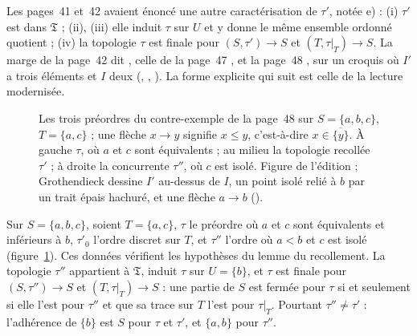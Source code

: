 Les pages~41 et~42 avaient énoncé une autre caractérisation de $\tau'$, notée e) : (i) $\tau'$ est dans $\mathfrak T$ ; (ii), (iii) elle induit $\tau$ sur $U$ et y donne le même ensemble ordonné quotient ; (iv) la topologie $\tau$ est finale pour $(S, \tau') \to S$ et $(T, \tau|_T) \to S$. La marge de la page~42 dit , celle de la page~47 , et la page~48 , sur un croquis où $I'$ a trois éléments et $I$ deux (, , ). La forme explicite qui suit est celle de la lecture modernisée.

\begin{figure}[htbp]
\centering
{}
\caption{Les trois préordres du contre-exemple de la page~48 sur $S = \{a, b, c\}$, $T = \{a, c\}$ ; une flèche $x \to y$ signifie $x \leq y$, c'est-à-dire $x \in \overline{\{y\}}$. À gauche $\tau$, où $a$ et $c$ sont équivalents ; au milieu la topologie recollée $\tau'$ ; à droite la concurrente $\tau''$, où $c$ est isolé. Figure de l'édition ; Grothendieck dessine $I'$ au-dessus de $I$, un point isolé relié à $b$ par un trait épais hachuré, et une flèche $a \to b$ ().}
\label{fig:156-5-ultrafaux}
\end{figure}

\begin{encadre}
\begin{contrexemple}
Sur $S = \{a, b, c\}$, soient $T = \{a, c\}$, $\tau$ le préordre où $a$ et $c$ sont équivalents et inférieurs à $b$, $\tau'_0$ l'ordre discret sur $T$, et $\tau''$ l'ordre où $a < b$ et $c$ est isolé (figure~\ref{fig:156-5-ultrafaux}). Ces données vérifient les hypothèses du lemme du recollement. La topologie $\tau''$ appartient à $\mathfrak T$, induit $\tau$ sur $U = \{b\}$, et $\tau$ est finale pour $(S, \tau'') \to S$ et $(T, \tau|_T) \to S$ : une partie de $S$ est fermée pour $\tau$ si et seulement si elle l'est pour $\tau''$ et que sa trace sur $T$ l'est pour $\tau|_T$. Pourtant $\tau'' \neq \tau'$ : l'adhérence de $\{b\}$ est $S$ pour $\tau$ et $\tau'$, et $\{a, b\}$ pour $\tau''$.
\end{contrexemple}
\end{encadre}

